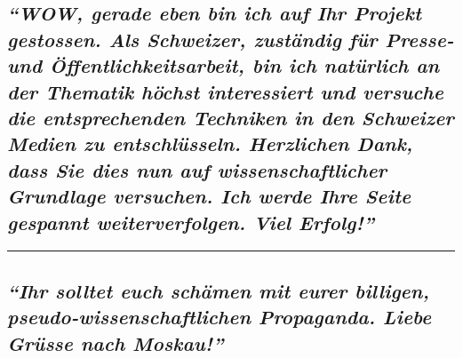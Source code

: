 \hypertarget{wow-gerade-eben-bin-ich-auf-ihr-projekt-gestossen-als-schweizer-zustuxe4ndig-fuxfcr-presse--und-uxf6ffentlichkeitsarbeit-bin-ich-natuxfcrlich-an-der-thematik-huxf6chst-interessiert-und-versuche-die-entsprechenden-techniken-in-den-schweizer-medien-zu-entschluxfcsseln-herzlichen-dank-dass-sie-dies-nun-auf-wissenschaftlicher-grundlage-versuchen-ich-werde-ihre-seite-gespannt-weiterverfolgen-viel-erfolg}{%
\subsection{\texorpdfstring{\emph{``WOW, gerade eben bin ich auf Ihr
Projekt gestossen. Als Schweizer, zuständig für Presse- und
Öffentlichkeitsarbeit, bin ich natürlich an der Thematik höchst
interessiert und versuche die entsprechenden Techniken in den Schweizer
Medien zu entschlüsseln. Herzlichen Dank, dass Sie dies nun auf
wissenschaftlicher Grundlage versuchen. Ich werde Ihre Seite gespannt
weiterverfolgen. Viel
Erfolg!''}}{``WOW, gerade eben bin ich auf Ihr Projekt gestossen. Als Schweizer, zuständig für Presse- und Öffentlichkeitsarbeit, bin ich natürlich an der Thematik höchst interessiert und versuche die entsprechenden Techniken in den Schweizer Medien zu entschlüsseln. Herzlichen Dank, dass Sie dies nun auf wissenschaftlicher Grundlage versuchen. Ich werde Ihre Seite gespannt weiterverfolgen. Viel Erfolg!''}}\label{wow-gerade-eben-bin-ich-auf-ihr-projekt-gestossen-als-schweizer-zustuxe4ndig-fuxfcr-presse--und-uxf6ffentlichkeitsarbeit-bin-ich-natuxfcrlich-an-der-thematik-huxf6chst-interessiert-und-versuche-die-entsprechenden-techniken-in-den-schweizer-medien-zu-entschluxfcsseln-herzlichen-dank-dass-sie-dies-nun-auf-wissenschaftlicher-grundlage-versuchen-ich-werde-ihre-seite-gespannt-weiterverfolgen-viel-erfolg}}

\begin{center}\rule{0.5\linewidth}{\linethickness}\end{center}

\hypertarget{ihr-solltet-euch-schuxe4men-mit-eurer-billigen-pseudo-wissenschaftlichen-propaganda-liebe-gruxfcsse-nach-moskau}{%
\subsection{\texorpdfstring{\emph{``Ihr solltet euch schämen mit eurer
billigen, pseudo-wissenschaftlichen Propaganda. Liebe Grüsse nach
Moskau!''}}{``Ihr solltet euch schämen mit eurer billigen, pseudo-wissenschaftlichen Propaganda. Liebe Grüsse nach Moskau!''}}\label{ihr-solltet-euch-schuxe4men-mit-eurer-billigen-pseudo-wissenschaftlichen-propaganda-liebe-gruxfcsse-nach-moskau}}

